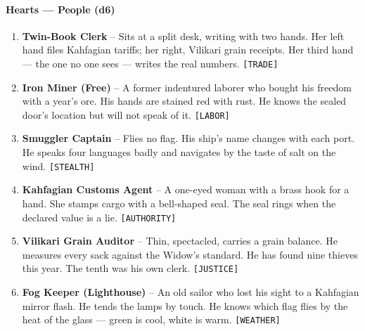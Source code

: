 \paragraph{Hearts --- People (d6)}
\begin{enumerate}
\item \textbf{Twin-Book Clerk} -- Sits at a split desk, writing with two hands. Her left hand files Kahfagian tariffs; her right, Vilikari grain receipts. Her third hand --- the one no one sees --- writes the real numbers. \texttt{[TRADE]}
\item \textbf{Iron Miner (Free)} -- A former indentured laborer who bought his freedom with a year's ore. His hands are stained red with rust. He knows the sealed door's location but will not speak of it. \texttt{[LABOR]}
\item \textbf{Smuggler Captain} -- Flies no flag. His ship's name changes with each port. He speaks four languages badly and navigates by the taste of salt on the wind. \texttt{[STEALTH]}
\item \textbf{Kahfagian Customs Agent} -- A one-eyed woman with a brass hook for a hand. She stamps cargo with a bell-shaped seal. The seal rings when the declared value is a lie. \texttt{[AUTHORITY]}
\item \textbf{Vilikari Grain Auditor} -- Thin, spectacled, carries a grain balance. He measures every sack against the Widow's standard. He has found nine thieves this year. The tenth was his own clerk. \texttt{[JUSTICE]}
\item \textbf{Fog Keeper (Lighthouse)} -- An old sailor who lost his sight to a Kahfagian mirror flash. He tends the lamps by touch. He knows which flag flies by the heat of the glass --- green is cool, white is warm. \texttt{[WEATHER]}
\end{enumerate}

